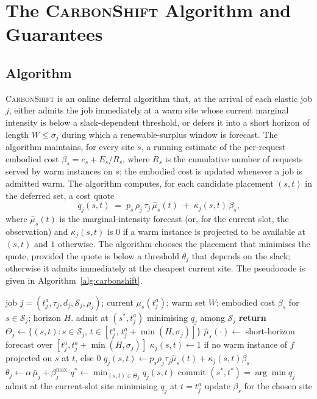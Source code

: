 \section{The \textsc{CarbonShift} Algorithm and Guarantees}
\label{sec:algorithm}

\subsection{Algorithm}
\textsc{CarbonShift} is an online deferral algorithm that, at the arrival of each elastic job $j$, either admits the job immediately at a warm site whose current marginal intensity is below a slack-dependent threshold, or defers it into a short horizon of length $W\le\sigma_j$ during which a renewable-surplus window is forecast. The algorithm maintains, for every site $s$, a running estimate of the per-request embodied cost $\beta_s = e_s + E_s/R_s$, where $R_s$ is the cumulative number of requests served by warm instances on $s$; the embodied cost is updated whenever a job is admitted warm. The algorithm computes, for each candidate placement $(s,t)$ in the deferred set, a cost quote
\begin{equation}
q_j(s,t) \;=\; p_s\,\rho_j\,\tau_j\,\hat\mu_s(t) \;+\; \kappa_j(s,t)\,\beta_s,
\label{eq:quote}
\end{equation}
where $\hat\mu_s(t)$ is the marginal-intensity forecast (or, for the current slot, the observation) and $\kappa_j(s,t)$ is $0$ if a warm instance is projected to be available at $(s,t)$ and $1$ otherwise. The algorithm chooses the placement that minimises the quote, provided the quote is below a threshold $\theta_j$ that depends on the slack; otherwise it admits immediately at the cheapest current site. The pseudocode is given in Algorithm~\ref{alg:carbonshift}.

\begin{algorithm}[tb]
\caption{\textsc{CarbonShift} per-job decision}
\label{alg:carbonshift}
\begin{algorithmic}[1]
\Require job $j=(t^a_j,\tau_j,d_j,\mathcal{S}_j,\rho_j)$; current $\mu_s(t^a_j)$; warm set $W$; embodied cost $\beta_s$ for $s\in\mathcal{S}_j$; horizon $H$.
 
  \State admit at $(s^*,t^a_j)$ minimising $q_j$ among $\mathcal{S}_j$ \textbf{return}
\EndIf
\State $\Theta_j \gets \{(s,t): s\in\mathcal{S}_j,\, t\in[t^a_j,\,t^a_j+\min(H,\sigma_j)]\}$
\State $\hat\mu_s(\cdot)\gets$ short-horizon forecast over $[t^a_j,t^a_j+\min(H,\sigma_j)]$
  \State $\kappa_j(s,t)\gets 1$ if no warm instance of $f$ projected on $s$ at $t$, else $0$
  \State $q_j(s,t)\gets p_s\rho_j\tau_j\hat\mu_s(t)+\kappa_j(s,t)\beta_s$
\EndFor
\State $\theta_j \gets \alpha\,\bar\mu_j + \beta^{\max}_j$ 
\State $q^{*}\gets \min_{(s,t)\in\Theta_j} q_j(s,t)$
  \State commit $(s^{*},t^{*}) = \arg\min q_j$
\Else
  \State admit at the current-slot site minimising $q_j$ at $t=t^a_j$
\EndIf
\State update $\beta_s$ for the chosen site
\end{algorithmic}
\end{algorithm}

